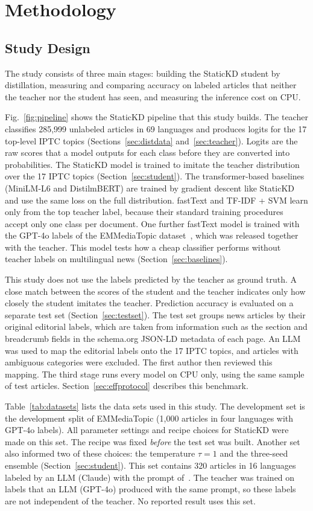\documentclass[journal]{IEEEtran}
\begin{document}
\section{Methodology}
\label{sec:method}
\subsection{Study Design}
The study consists of three main stages: building the StaticKD student by distillation, measuring and comparing accuracy on labeled articles that neither the teacher nor the student has seen, and measuring the inference cost on CPU.

Fig.~\ref{fig:pipeline} shows the StaticKD pipeline that this study builds. The teacher classifies 285,999 unlabeled articles in 69 languages and produces logits for the 17 top-level IPTC topics (Sections~\ref{sec:distdata} and~\ref{sec:teacher}). Logits are the raw scores that a model outputs for each class before they are converted into probabilities. The StaticKD model is trained to imitate the teacher distribution over the 17 IPTC topics (Section~\ref{sec:student}). The transformer-based baselines (MiniLM-L6 and DistilmBERT) are trained by gradient descent like StaticKD and use the same loss on the full distribution. fastText and TF-IDF + SVM learn only from the top teacher label, because their standard training procedures accept only one class per document. One further fastText model is trained with the GPT-4o labels of the EMMediaTopic dataset~\cite{emmediatopic2025}, which was released together with the teacher. This model tests how a cheap classifier performs without teacher labels on multilingual news (Section~\ref{sec:baselines}).

This study does not use the labels predicted by the teacher as ground truth. A close match between the scores of the student and the teacher indicates only how closely the student imitates the teacher. Prediction accuracy is evaluated on a separate test set (Section~\ref{sec:testset}). The test set groups news articles by their original editorial labels, which are taken from information such as the section and breadcrumb fields in the schema.org JSON-LD metadata of each page. An LLM was used to map the editorial labels onto the 17 IPTC topics, and articles with ambiguous categories were excluded. The first author then reviewed this mapping. The third stage runs every model on CPU only, using the same sample of test articles. Section~\ref{sec:effprotocol} describes this benchmark.

Table~\ref{tab:datasets} lists the data sets used in this study. The development set is the development split of EMMediaTopic (1,000 articles in four languages with GPT-4o labels). All parameter settings and recipe choices for StaticKD were made on this set. The recipe was fixed \emph{before} the test set was built. Another set also informed two of these choices: the temperature $\tau=1$ and the three-seed ensemble (Section~\ref{sec:student}). This set contains 320 articles in 16 languages labeled by an LLM (Claude) with the prompt of~\cite{kuzman2025llm}. The teacher was trained on labels that an LLM (GPT-4o) produced with the same prompt, so these labels are not independent of the teacher. No reported result uses this set.
\end{document}

